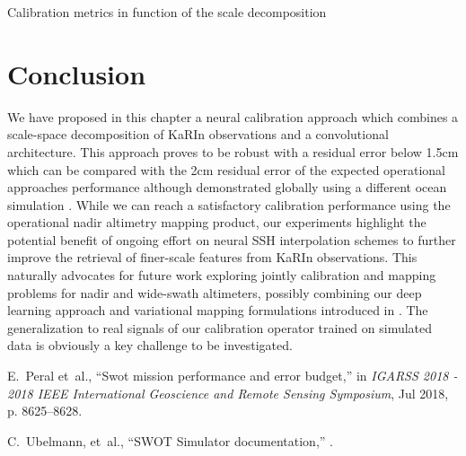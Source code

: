 \begin{bibunit}
\begin{table}[!t]
\begin{center}
	
\end{center}
\caption{Calibration metrics in function of the scale decomposition}
\label{c3table:scale_dec}
\end{table}

\section{Conclusion}
\label{c3sec:conclusion}
\noindent
We have proposed in this chapter a neural calibration approach which combines a scale-space decomposition of KaRIn observations and a convolutional architecture. This approach proves to be robust with a 
residual error below 1.5cm which can be compared with the 2cm residual error of the expected operational approaches performance although demonstrated globally using a different ocean simulation \cite{Dibarboure_Ubelmann_Flamant_Briol_Peral_Bracher_Vergara_Faugere_Soulat_Picot_2022}. While we can reach a satisfactory calibration performance using the operational nadir altimetry mapping product, our experiments highlight the potential benefit of ongoing effort on neural SSH interpolation schemes to further improve the retrieval of finer-scale features from KaRIn observations.
This naturally advocates for future work exploring jointly calibration and mapping problems for nadir and wide-swath altimeters, possibly combining our deep learning approach and variational mapping formulations introduced in \cite{Febvre_Fablet_Sommer_Ubelmann_2022}.
The generalization to real signals of our calibration operator trained on simulated data is obviously a key challenge to be investigated.


% 
% 
\begin{thebibliography}{10}

E.~Peral et~al.,
\newblock ``Swot mission performance and error budget,''
\newblock in {\em IGARSS 2018 - 2018 IEEE International Geoscience and Remote
  Sensing Symposium}, Jul 2018, p. 8625–8628.

C.~Ubelmann, et~al.,
\newblock ``{SWOT} {Simulator} documentation,'' .


\end{thebibliography}
\end{bibunit}
